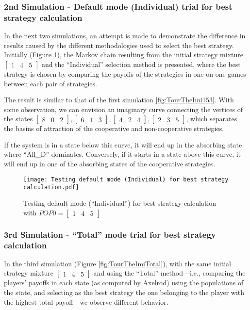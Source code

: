 \subsubsection{2nd Simulation - Default mode (Individual) trial for best strategy calculation}
In the next two simulations, an attempt is made to demonstrate the difference in results caused by the different methodologies used to select the best strategy. Initially (Figure \ref{fig:TourTheImiIndividual}), the Markov chain resulting from the initial strategy mixture $\begin{bmatrix}1 & 4 & 5\end{bmatrix}$ and the ``Individual'' selection method is presented, where the best strategy is chosen by comparing the payoffs of the strategies in one-on-one games between each pair of strategies.

The result is similar to that of the first simulation \ref{fig:TourTheImi153}. With some observation, we can envision an imaginary curve connecting the vertices of the states $\begin{bmatrix}8 & 0 & 2\end{bmatrix}, \begin{bmatrix}6 & 1 & 3\end{bmatrix}, \begin{bmatrix}4 & 2 & 4\end{bmatrix}, \begin{bmatrix}2 & 3 & 5\end{bmatrix}$, which separates the basins of attraction of the cooperative and non-cooperative strategies. 

If the system is in a state below this curve, it will end up in the absorbing state where ``All\_D'' dominates. Conversely, if it starts in a state above this curve, it will end up in one of the absorbing states of the cooperative strategies.

	\begin{figure}[h]
	      \centering
	      \texttt{[image: Testing default mode (Individual) for best strategy calculation.pdf]}
	      \caption{Testing default mode (``Individual'') for best strategy calculation with $POP0=\begin{bmatrix}1&4&5\end{bmatrix}$}
	      \label{fig:TourTheImiIndividual}
	\end{figure}
\subsubsection{3rd Simulation - ``Total'' mode trial for best strategy calculation}
In the third simulation (Figure \ref{fig:TourTheImiTotal}), with the same initial strategy mixture $\begin{bmatrix}1 & 4 & 5\end{bmatrix}$ and using the ``Total'' method—i.e., comparing the players' payoffs in each state (as computed by Axelrod) using the populations of the state, and selecting as the best strategy the one belonging to the player with the highest total payoff—we observe different behavior.

